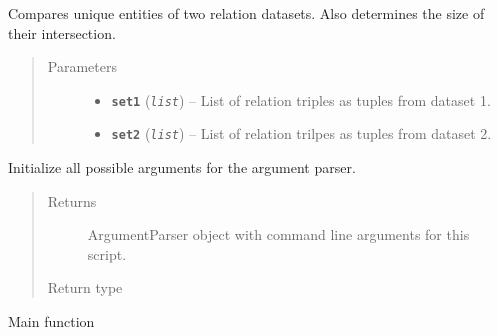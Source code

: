 \documentclass[letterpaper,10pt,english]{sphinxmanual}
\begin{document}
\begin{fulllineitems}
\label{src.trans_e:src.trans_e.differentiate_datasets.compare_entities}
Compares unique entities of two relation datasets.
Also determines the size of their intersection.
\begin{quote}\begin{description}
\item[{Parameters}] \leavevmode\begin{itemize}
\item {} 
\textbf{\texttt{set1}} (\emph{\texttt{list}}) -- List of relation triples as tuples from dataset 1.

\item {} 
\textbf{\texttt{set2}} (\emph{\texttt{list}}) -- List of relation trilpes as tuples from dataset 2.

\end{itemize}

\end{description}\end{quote}

\end{fulllineitems}


\begin{fulllineitems}
\label{src.trans_e:src.trans_e.differentiate_datasets.init_argparse}
Initialize all possible arguments for the argument parser.
\begin{quote}\begin{description}
\item[{Returns}] \leavevmode
ArgumentParser object with command line arguments for this script.

\item[{Return type}] \leavevmode
{}

\end{description}\end{quote}

\end{fulllineitems}


\begin{fulllineitems}
\label{src.trans_e:src.trans_e.differentiate_datasets.main}
Main function

\end{fulllineitems}
\end{document}
